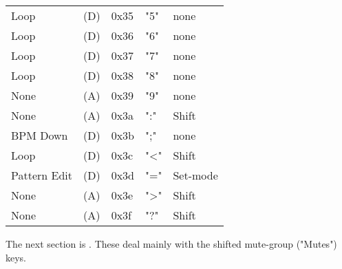 \begin{table}[htb!]
\begin{tabular}{l l l l l}
        Loop               & (D)  &  0x35   & "5"          & none \\
        Loop               & (D)  &  0x36   & "6"          & none \\
        Loop               & (D)  &  0x37   & "7"          & none \\
        Loop               & (D)  &  0x38   & "8"          & none \\
        None               & (A)  &  0x39   & "9"          & none \\
        None               & (A)  &  0x3a   & ":"          & Shift \\
        BPM Down           & (D)  &  0x3b   & ";"          & none \\
        Loop               & (D)  &  0x3c   & "<"          & Shift \\
        Pattern Edit       & (D)  &  0x3d   & "="          & Set-mode \\
        None               & (A)  &  0x3e   & ">"          & Shift \\
        None               & (A)  &  0x3f   & "?"          & Shift \\
      \end{tabular}
   \end{table}

   The next section is .
   These deal mainly with the shifted mute-group ("Mutes") keys.


